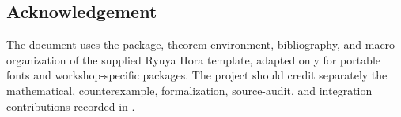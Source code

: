 \documentclass{amsart}
\begin{document}
\subsection*{Acknowledgement}

The document uses the package, theorem-environment, bibliography, and macro organization of the supplied Ryuya Hora  template, adapted only for portable fonts and workshop-specific packages.  The project should credit separately the mathematical, counterexample, formalization, source-audit, and integration contributions recorded in .

\printbibliography
\end{document}
